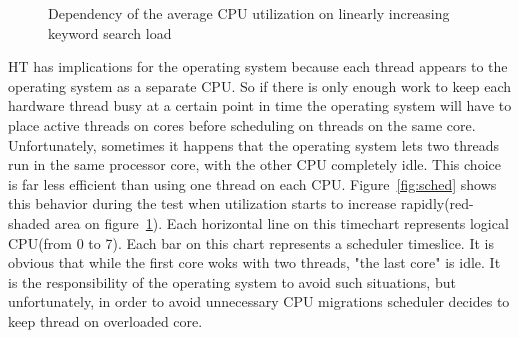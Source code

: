 \documentclass[12pt]{article}
\begin{document}
\begin{figure}[h]
    \centering
	\caption{Dependency of the average CPU utilization on linearly increasing keyword search load}
    \label{fig:cpu}
\end{figure}

HT has implications for the operating system because each thread appears to the operating system as a separate CPU. So if there is only enough work to keep each hardware thread busy at a certain point in time the operating system will have to place active threads on cores before scheduling on threads on the same core. Unfortunately, sometimes it happens that the operating system lets two threads run in the same processor core, with the other CPU completely idle. This choice is far less efficient than using one thread on each CPU. Figure~\ref{fig:sched} shows this behavior during the test when utilization starts to increase rapidly(red-shaded area on figure~\ref{fig:cpu}). Each horizontal line on this timechart represents logical CPU(from 0 to 7). Each bar on this chart represents a scheduler timeslice. It is obvious that while the first core woks with two threads, "the last core" is idle. It is the responsibility of the operating system to avoid such situations, but unfortunately, in order to avoid unnecessary CPU migrations scheduler decides to keep thread on overloaded core.  
\end{document}
